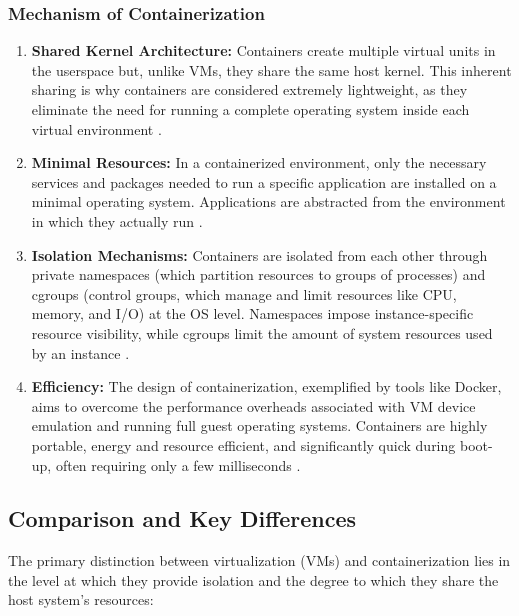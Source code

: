 \subsubsection{Mechanism of Containerization}
\begin{enumerate}
    \item \textbf{Shared Kernel Architecture:} Containers create multiple virtual units in the userspace but, unlike VMs, they share the same host kernel. This inherent sharing is why containers are considered extremely lightweight, as they eliminate the need for running a complete operating system inside each virtual environment \cite{Containers_or_Hypervisors_Which_is_Better_for_Database_Consolidation, Emerging_Trends_Techniques_and_Open_Issues_of_Containerization_A_Review}.

    \item \textbf{Minimal Resources:} In a containerized environment, only the necessary services and packages needed to run a specific application are installed on a minimal operating system. Applications are abstracted from the environment in which they actually run \cite{Comparison_of_Containerization_and_Virtualization_in_Cloud_Architectures, Emerging_Trends_Techniques_and_Open_Issues_of_Containerization_A_Review}.

    \item  \textbf{Isolation Mechanisms:} Containers are isolated from each other through private namespaces (which partition resources to groups of processes) and cgroups (control groups, which manage and limit resources like CPU, memory, and I/O) at the OS level. Namespaces impose instance-specific resource visibility, while cgroups limit the amount of system resources used by an instance \cite{Emerging_Trends_Techniques_and_Open_Issues_of_Containerization_A_Review}.

    \item \textbf{Efficiency:} The design of containerization, exemplified by tools like Docker, aims to overcome the performance overheads associated with VM device emulation and running full guest operating systems. Containers are highly portable, energy and resource efficient, and significantly quick during boot-up, often requiring only a few milliseconds \cite{Containers_or_Hypervisors_Which_is_Better_for_Database_Consolidation, Emerging_Trends_Techniques_and_Open_Issues_of_Containerization_A_Review}.
\end{enumerate}

\subsection{Comparison and Key Differences}
The primary distinction between virtualization (VMs) and containerization lies in the level at which they provide isolation and the degree to which they share the host system's resources:

